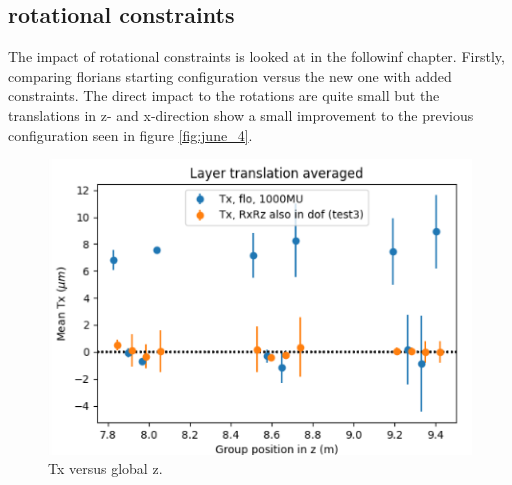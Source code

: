 \subsection{rotational constraints}
The impact of rotational constraints is looked at in the followinf chapter. Firstly, comparing
florians starting configuration versus the new one with added constraints.
The direct impact to the rotations are quite small but the translations
in z- and x-direction show a small improvement to the previous configuration
seen in figure \ref{fig:june_4}.

\begin{figure}
  \centering
  \includegraphics[width=\textwidth]{plots/july_28/Tx.png}
  \caption{Tx versus global z.}
\end{figure}


